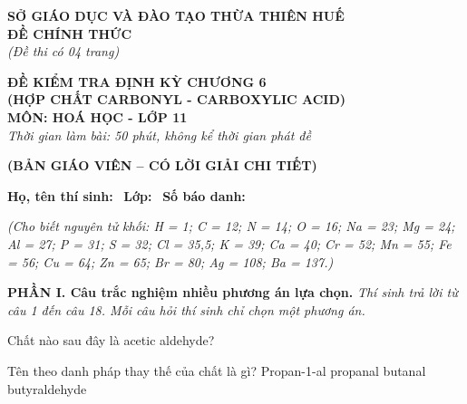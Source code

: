 \documentclass[12pt,a4paper]{article}
\begin{document}
\thispagestyle{firstpage}

\noindent
\begin{minipage}[t]{0.44\textwidth}
	\centering\fontsize{10pt}{12pt}\selectfont
	\textbf{SỞ GIÁO DỤC VÀ ĐÀO TẠO THỪA THIÊN HUẾ}\\
	\textbf{ĐỀ CHÍNH THỨC}\\
	\textit{(Đề thi có 04 trang)}
\end{minipage}\hfill
\begin{minipage}[t]{0.54\textwidth}
	\centering\fontsize{10.5pt}{13pt}\selectfont
	\textbf{ĐỀ KIỂM TRA ĐỊNH KỲ CHƯƠNG 6}\\
	\textbf{(HỢP CHẤT CARBONYL - CARBOXYLIC ACID)}\\
	\textbf{MÔN: HOÁ HỌC - LỚP 11}\\
	\textit{Thời gian làm bài: 50 phút, không kể thời gian phát đề}
	
	\smallskip
\end{minipage}

\smallskip
\begin{center}
	{\color{hfRed}\textbf{\large (BẢN GIÁO VIÊN -- CÓ LỜI GIẢI CHI TIẾT)}}
\end{center}

\smallskip
\noindent\hrulefill
\smallskip

\noindent\textbf{Họ, tên thí sinh:} \dotfill\ \textbf{Lớp:} \dotfill\ \textbf{Số báo danh:} \dotfill

\smallskip
\noindent\textit{(Cho biết nguyên tử khối: H = 1; C = 12; N = 14; O = 16; Na = 23; Mg = 24; Al = 27; P = 31; S = 32; Cl = 35,5; K = 39; Ca = 40; Cr = 52; Mn = 55; Fe = 56; Cu = 64; Zn = 65; Br = 80; Ag = 108; Ba = 137.)}

\smallskip
\noindent\textbf{\large PHẦN I. Câu trắc nghiệm nhiều phương án lựa chọn.}
\textit{Thí sinh trả lời từ câu 1 đến câu 18. Mỗi câu hỏi thí sinh chỉ chọn một phương án.}
\vspace{0.2cm}

\begin{ex}
Chất nào sau đây là acetic aldehyde?
\choice
{}
{\True {}}
{}
{}

\end{ex}

\begin{ex}
Tên theo danh pháp thay thế của chất  là gì?
\choice
{Propan-1-al}
{propanal}
{\True butanal}
{butyraldehyde}

\end{ex}
\end{document}
